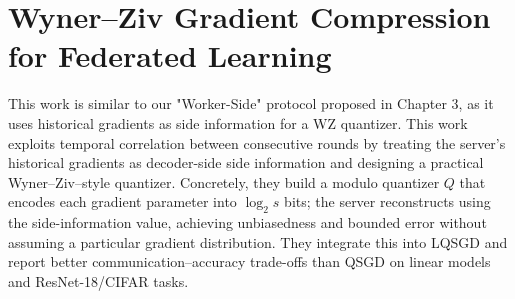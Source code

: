 \section{Wyner–Ziv Gradient Compression for Federated Learning}
This work \cite{liang2021wynerziv} is similar to our "Worker-Side" protocol proposed in Chapter 3, as it uses historical gradients as side information for a WZ quantizer.
This work exploits temporal correlation between consecutive rounds by treating the server's historical gradients as decoder-side side information and designing a practical Wyner–Ziv–style quantizer. Concretely, they build a modulo quantizer $Q$ that encodes each gradient parameter into $\log_2 s$ bits; the server reconstructs using the side-information value, achieving unbiasedness and bounded error without assuming a particular gradient distribution. They integrate this into LQSGD and report better communication–accuracy trade-offs than QSGD on linear models and ResNet-18/CIFAR tasks.
